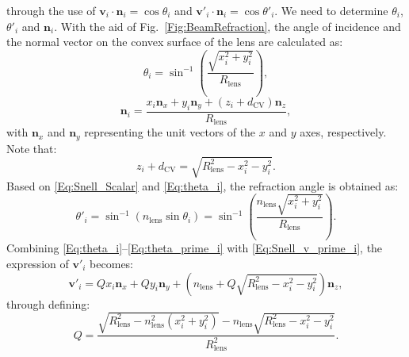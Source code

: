 \documentclass[lettersize,journal]{IEEEtran}
\begin{document}
%
through the use of $\mathbf{v}_i\cdot\mathbf{n}_i=\cos{\theta_i}$ and $\mathbf{v}'_i\cdot\mathbf{n}_i=\cos{\theta'_i}$. We need to determine $\theta_i$, $\theta'_i$ and $\mathbf{n}_i$. With the aid of Fig.~\ref{Fig:BeamRefraction}, the angle of incidence and the normal vector on the convex surface of the lens are calculated as:
%
\begin{equation}
\theta_i = \sin^{-1} \left(\dfrac{\sqrt{x_i^2 + y_i^2}}{R_\mathrm{lens}}\right),
\label{Eq:theta_i}
\end{equation}
%
\begin{equation}
\mathbf{n}_i = \frac{x_i\mathbf{n}_{x} + y_i\mathbf{n}_{y} + (z_i+d_\mathrm{CV})\mathbf{n}_{z}}{R_\mathrm{lens}},
\end{equation}
%
with $\mathbf{n}_{x}$ and $\mathbf{n}_{y}$ representing the unit vectors of the $x$ and $y$ axes, respectively. Note that: 
\begin{equation}
z_i+d_\mathrm{CV} = \sqrt{R_\mathrm{lens}^2-x_i^2 - y_i^2}.
\label{Eq:z_i}
\end{equation}
Based on \eqref{Eq:Snell_Scalar} and \eqref{Eq:theta_i}, the refraction angle is obtained as:
%
\begin{equation}
\theta'_i = \sin^{-1}\left(n_\mathrm{lens}\sin\theta_i\right) = \sin^{-1}\left(\dfrac{{n_\mathrm{lens}}\sqrt{x_i^2 + y_i^2}}{R_\mathrm{lens}}\right).
\label{Eq:theta_prime_i}
\end{equation}
%
Combining \eqref{Eq:theta_i}--\eqref{Eq:theta_prime_i} with \eqref{Eq:Snell_v_prime_i}, the expression of $\mathbf{v}'_i$ becomes:
%
\begin{equation}
    \mathbf{v}'_i = Q x_i\mathbf{n}_x + Q y_i\mathbf{n}_y + \left(n_\mathrm{lens}+Q\sqrt{R_\mathrm{lens}^2-x_i^2 - y_i^2}\right)\mathbf{n}_z,
   \label{Eq:v_prime_i}
\end{equation}
%
through defining:
%
\begin{equation}
    Q = \frac{\sqrt{R_\mathrm{lens}^2-n_\mathrm{lens}^2\left(x_i^2 + y_i^2\right)}-n_\mathrm{lens}\sqrt{R_\mathrm{lens}^2-x_i^2 - y_i^2}}{R_\mathrm{lens}^2}.
   \label{Eq:v_prime_i_Q}
\end{equation}
%

\end{document}
